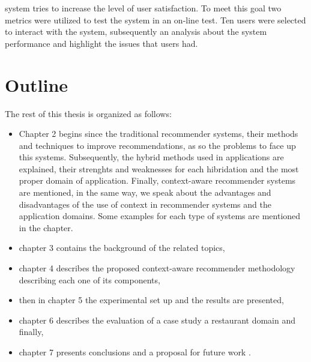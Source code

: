 system tries to increase the level of user satisfaction. To meet this
goal two metrics were utilized to test the system in an on-line test.
Ten users were selected to interact with the system, subsequently 
an analysis about the system performance and highlight the issues 
that users had.\\

\section{Outline}

The rest of this thesis is organized as follows: 
\begin{itemize}  
\item Chapter 2 begins since the traditional recommender systems,
their methods and techniques to improve recommendations, as so the
problems to face up this systems. Subsequently, the hybrid methods
used in applications are explained, their strenghts and weaknesses
for each hibridation and the most proper domain of application.
Finally, context-aware recommender systems are mentioned, in the same
way, we speak about the advantages and disadvantages of the use of
context in recommender systems and the application domains. Some
examples for each type of systems are mentioned in the chapter.
\item chapter 3 contains the background of the related topics, 
\item chapter 4  describes the proposed context-aware recommender methodology describing each one of its components, 
\item then in chapter 5 the experimental set up and the results are presented, 
\item chapter 6 describes the evaluation of a case study a restaurant domain and finally, 
\item chapter 7 presents conclusions and a proposal for future work .
\end{itemize}  




